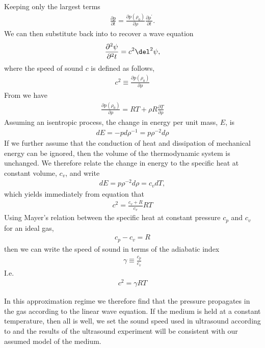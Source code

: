 Keeping only the largest terms
\begin{align}
 \frac{\partial p}{\partial t} = \frac{\partial p(\rho_0)}{\partial \rho} \frac{\partial \rho^\prime}{\partial t}.
\end{align}
We can then substitute back into \eqnref{} to recover a wave equation
\begin{align}
\frac{\partial^2 \psi}{\partial^2 t} = c^2 \del^2 \psi,
\end{align}
where the speed of sound $c$ is defined as follows,
\begin{align}
c^2 \equiv \frac{\partial p(\rho_0)}{\partial \rho}
\end{align}
From \eqnref{} we have
\begin{align}
   \frac{\partial p(\rho_0)}{\partial \rho} = RT + \rho R \frac{\partial T}{\partial \rho}
\end{align}
Assuming an isentropic process, the change in energy per unit mass, $E$, is 
\begin{align}
  dE = -pd\rho^{-1} = p \rho^{-2} d\rho
\end{align}
If we further assume that the conduction of heat and dissipation of mechanical energy can be ignored, 
then the volume of the thermodynamic system is unchanged.  
We therefore relate the change in energy to the specific heat at constant volume, $c_v$,  and write
\begin{align}
  dE = p \rho^{-2} d\rho = c_v dT,
\end{align}
which yields immediately from equation \eqnref{} that
\begin{align}
  c^2 = \frac{c_v + R}{c_v}RT
\end{align}
Using Mayer's relation between the specific heat at constant pressure $c_p$ and $c_v$ for an ideal gas,
\begin{align}
  c_p - c_v = R
\end{align}
then we can write the speed of sound in terms of the adiabatic index 
\begin{align}
\gamma \equiv  \frac{c_p}{c_v}
\end{align}
I.e.
\begin{align}
  c^2 = \gamma RT
\end{align}


In this approximation regime we therefore find that the pressure propagates in the gas according to the linear wave equation.
If the medium is held at a constant temperature, then all is well, we set the sound speed used in ultrasound according to \eqnref{} and the results of the 
ultrasound experiment will be consistent with our assumed model of the medium.

